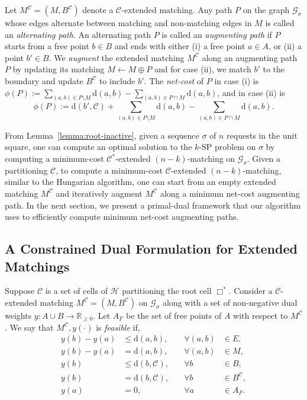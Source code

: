 \documentclass[11pt,onecolumn]{article}
\def\mcC{{\mathcal{C}}}
\def\mcG{{\mathcal{G}}}
\def\mcH{{\mathcal{H}}}
\def\mbR{{\mathbb{R}}}
\newcommand{\cell}{\Box}
\newcommand{\distance}[2]{\mathrm{d}(#1, #2)}
\begin{document}
Let $M^\mcC=(M, B^\mcC)$ denote a $\mcC$-extended matching.
Any path $P$ on the graph $\mcG_\sigma$ whose edges alternate between matching and non-matching edges in $M$ is called an \emph{alternating path}. 
An alternating path $P$ is called an \emph{augmenting path} if $P$ starts from a free point $b\in B$ and ends with either (i) a free point $a\in A$, or (ii) a point $b'\in B$.  We \emph{augment} the extended matching $M^{\mcC}$ along an augmenting path $P$ by updating its matching $M\leftarrow M\oplus P$ and for case (ii), we match $b'$ to the boundary and update $B^\mcC$ to include $b'$. The \emph{net-cost} of $P$ in case (i) is $\phi(P):=\sum_{(a,b)\in P\setminus M}\distance{a}{b} - \sum_{(a,b)\in P\cap M}\distance{a}{b}$, and 
in case (ii) is \[\phi(P):=\distance{b'}{\mcC} + \sum_{(a,b)\in P\setminus M}\distance{a}{b} - \sum_{(a,b)\in P\cap M}\distance{a}{b}.\] 


From Lemma~\ref{lemma:root-inactive}, given a sequence $\sigma$ of $n$ requests in the unit square, one can compute an optimal solution to the $k$-SP problem on $\sigma$ by computing a minimum-cost $\mcC^*$-extended $(n-k)$-matching on $\mcG_\sigma$. Given a partitioning $\mcC$, to compute a minimum-cost $\mcC$-extended $(n-k)$-matching, similar to the Hungarian algorithm, one can start from an empty extended matching $M^\mcC$ and iteratively augment $M^\mcC$ along a minimum net-cost augmenting path. In the next section, we present a primal-dual framework that our algorithm uses to efficiently compute minimum net-cost augmenting paths.




\subsection{A Constrained Dual Formulation for Extended Matchings}\label{sec:dual}
Suppose $\mcC$ is a set of cells of $\mcH$ partitioning the root cell $\cell^*$. Consider a $\mcC$-extended matching $M^\mcC=(M, B^\mcC)$ on $\mcG_\sigma$ along with a set of non-negative dual weights $y:A\cup B\rightarrow \mbR_{\ge0}$. Let $A_F$ be the set of free points of $A$ with respect to $M^\mcC$. We say that $M^{\mcC}, y(\cdot)$ is \emph{feasible} if,
\begin{align}
    y(b) - y(a) &\le \distance{a}{b},&  \quad \forall(a,b)&\in E,\label{eq:dualfeasibility-non-matching-time}\\
    y(b) - y(a) &= \distance{a}{b},& \quad \forall(a,b)&\in M,\label{eq:dualfeasibility-matching-time}\\
%
%
%
    y(b) &\le \distance{b}{\mcC},&  \quad \forall b&\in B,\label{eq:dualfeasibility-b}\\
    y(b) &= \distance{b}{\mcC},&  \quad \forall b&\in B^\mcC,\label{eq:dualfeasibility-b-admissible}\\
    y(a) &= 0,& \quad \forall a&\in A_F.\label{eq:dualfeasibility-a-free}
\end{align}
\end{document}
